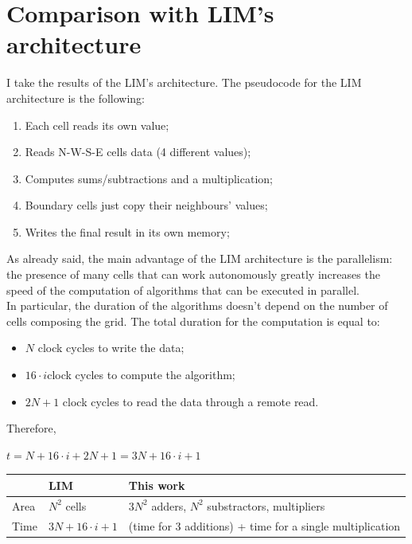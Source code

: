 \section{Comparison with LIM's architecture}
I take the results of the LIM's architecture. 
The pseudocode for the LIM architecture is the following:
\begin{enumerate}
 \item Each cell reads its own value; 
 \item Reads N-W-S-E cells data (4 different values);
 \item Computes sums/subtractions and a multiplication; 
 \item Boundary cells just copy their neighbours' values;
 \item Writes the final result in its own memory;
\end{enumerate}
As already said, the main advantage of the LIM architecture is the parallelism: the presence of many cells that can work autonomously greatly increases the speed of the computation of algorithms that can be executed in parallel.\\
In particular, the duration of the algorithms doesn't depend on the number of cells composing the grid.
The total duration for the computation is equal to:
\begin{itemize}
\item $ N $ clock cycles to write the data;
 \item $ 16 \cdot i  $clock cycles to compute the algorithm;
 \item $ 2N+1 $ clock cycles to read the data through a remote read.\\
\end{itemize}
Therefore,
\begin{center}
	$ t =  N + 16\cdot i +2N +1=3N + 16\cdot i +1  $
\end{center}
   \begin{center}
   	\begin{tabular}{ | p{1.8cm} | >{\centering\arraybackslash}p{6cm} | >{\centering\arraybackslash}p{6cm} | }
   		\hline
   		\label{table:tep_tab} & LIM & This work \\
   		\hline
   		Area & $ N^{2}$  cells   & $3N^{2}
   		$  adders, $N^{2}$ substractors, multipliers \\
   		\hline
   		Time & $3N + 16\cdot i +1 $&
   		
   		(time for 3 additions) + time for a single multiplication 
   		\\
   		\hline
   		
   	\end{tabular}
   \end{center}
   \clearpage
   \newpage

